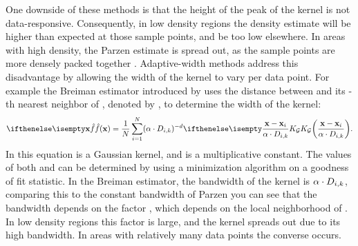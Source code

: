 	One downside of these methods is that the height of the peak of the kernel is not data-responsive. Consequently, in low density regions the density estimate will be higher than expected at those sample points, and be too low elsewhere. In areas with high density, the Parzen estimate is spread out, as the sample points are more densely packed together \cite{breiman1977variable}. Adaptive-width methods address this disadvantage by allowing the width of the kernel to vary per data point. For example the Breiman estimator introduced by \textcite{breiman1977variable} uses the distance between \varPattern[\itXis] and its \KNNK-th nearest neighbor of \varPattern[\itXis], denoted by \varKNNDistance{\itXis}{\KNNK}, to determine the width of the kernel:
	\begin{equation}\label{eq:1:BML}
	 	\varEstimatedDensityFunction{\varPattern} = \frac{1}{\varNumPatterns} \sum_{\itXis = 1}^{\varNumPatterns} (\varBMLconstant \cdot \varKNNDistance{\itXis}{k})^{-\varDim} \varKernel[\varGaussian]{\frac{\varPattern - \varPattern[\itXis]}{\varBMLconstant \cdot \varKNNDistance{\itXis}{k}}}.
	\end{equation} 
	In this equation \varKernel[\varGaussian]{} is a Gaussian kernel, and \varBMLconstant is a multiplicative constant. The values of both \varBMLconstant and \KNNK can be determined by using a minimization algorithm on a goodness of fit statistic. In the Breiman estimator, the bandwidth of the kernel is $\alpha \cdot D_{i, k}$, comparing this to the constant bandwidth \varBandwidth of Parzen you can see that the bandwidth depends on the factor \varKNNDistance{\itXis}{\KNNK}, which depends on the local neighborhood of \varPattern[\itXis]. In low density regions this factor is large, and the kernel spreads out due to its high bandwidth. In areas with relatively many data points the converse occurs.

